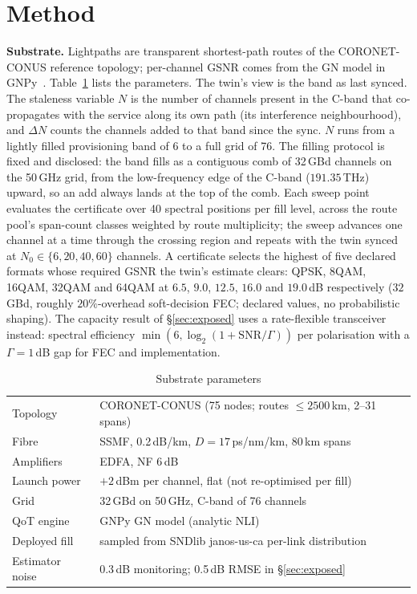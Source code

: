 \documentclass[letterpaper,10pt]{article}
\begin{document}
\section{Method}
\textbf{Substrate.} Lightpaths are transparent shortest-path routes of the
CORONET-CONUS reference topology; per-channel GSNR comes from the GN model in
GNPy~\cite{gnpy}. Table~\ref{tab:subst} lists the parameters. The twin's view is
the band as last synced. The staleness variable $N$ is the number of channels
present in the C-band that co-propagates with the service along its own path (its
interference neighbourhood), and $\Delta N$ counts the channels added to that band
since the sync. $N$ runs from a lightly filled provisioning band of 6 to a full
grid of 76. The filling protocol is fixed and disclosed: the band fills as a
contiguous comb of 32\,GBd channels on the 50\,GHz grid, from the low-frequency
edge of the C-band ($191.35$\,THz) upward, so an add always lands at the top of
the comb. Each sweep point evaluates the certificate over 40 spectral positions
per fill level, across the route pool's span-count classes weighted by route
multiplicity; the sweep advances one channel at a time through the crossing
region and repeats with the twin synced at $N_0\in\{6,20,40,60\}$ channels. A
certificate selects the highest of five declared formats whose
required GSNR the twin's estimate clears: QPSK, 8QAM, 16QAM, 32QAM and 64QAM at
$6.5$, $9.0$, $12.5$, $16.0$ and $19.0$\,dB respectively ($32$\,GBd, roughly
$20\%$-overhead soft-decision FEC; declared values, no probabilistic shaping). The
capacity result of \S\ref{sec:exposed} uses a rate-flexible transceiver instead:
spectral efficiency $\min(6,\log_2(1+\mathrm{SNR}/\Gamma))$ per polarisation with a
$\Gamma=1$\,dB gap for FEC and implementation.

\begin{table}[t]
\caption{Substrate parameters}
\label{tab:subst}
\centering
\footnotesize
\begin{tabular}{ll}
\hline
Topology & CORONET-CONUS (75 nodes; routes $\le 2500$\,km, 2--31 spans) \\
Fibre & SSMF, 0.2\,dB/km, $D=17$\,ps/nm/km, 80\,km spans \\
Amplifiers & EDFA, NF 6\,dB \\
Launch power & $+2$\,dBm per channel, flat (not re-optimised per fill) \\
Grid & 32\,GBd on 50\,GHz, C-band of 76 channels \\
QoT engine & GNPy GN model (analytic NLI) \\
Deployed fill & sampled from SNDlib janos-us-ca per-link distribution \\
Estimator noise & 0.3\,dB monitoring; 0.5\,dB RMSE in \S\ref{sec:exposed} \\
\hline
\end{tabular}
\end{table}
\end{document}
